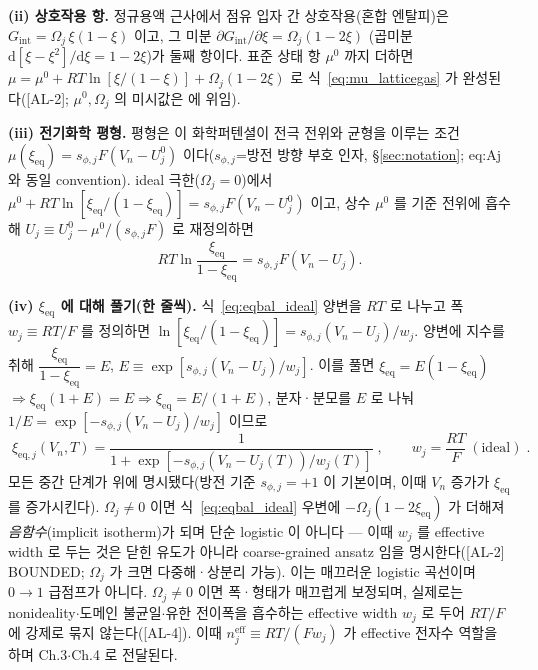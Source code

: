 \documentclass[11pt,a4paper]{article}
\newcommand{\dd}{\mathrm{d}}
\newcommand{\eff}{\mathrm{eff}}
\newcommand{\eq}{\mathrm{eq}}
\newcommand{\AL}[1]{\textsf{[AL-#1]}}
\begin{document}
\textbf{(ii) 상호작용 항.} 정규용액 근사에서 점유 입자 간 상호작용(혼합 엔탈피)은
$G_{\mathrm{int}}=\Omega_j\,\xi(1-\xi)$ 이고, 그 미분 $\partial G_{\mathrm{int}}/\partial\xi
=\Omega_j(1-2\xi)$ (곱미분 $\dd[\xi-\xi^2]/\dd\xi=1-2\xi$)가 둘째 항이다. 표준 상태 항 $\mu^0$ 까지 더하면
$\mu=\mu^0+RT\ln[\xi/(1-\xi)]+\Omega_j(1-2\xi)$ 로 식~\eqref{eq:mu_latticegas} 가 완성된다(\AL{2};
$\mu^0,\Omega_j$ 의 미시값은 \cite{mckinnon1983,bazant2013} 에 위임).

\textbf{(iii) 전기화학 평형.} 평형은 이 화학퍼텐셜이 전극 전위와 균형을 이루는 조건
$\mu(\xi_\eq)=s_{\phi,j}F(V_n-U_j^0)$ 이다($s_{\phi,j}$=방전 방향 부호 인자, \S\ref{sec:notation};
eq:Aj 와 동일 convention). ideal 극한($\Omega_j=0$)에서 $\mu^0+RT\ln[\xi_\eq/(1-\xi_\eq)]
=s_{\phi,j}F(V_n-U_j^0)$ 이고, 상수 $\mu^0$ 를 기준 전위에 흡수해 $U_j\equiv U_j^0-\mu^0/(s_{\phi,j}F)$ 로
재정의하면
\begin{equation}
RT\ln\frac{\xi_\eq}{1-\xi_\eq}=s_{\phi,j}F(V_n-U_j).
\label{eq:eqbal_ideal}
\end{equation}

\textbf{(iv) $\xi_\eq$ 에 대해 풀기(한 줄씩).} 식~\eqref{eq:eqbal_ideal} 양변을 $RT$ 로 나누고 폭
$w_j\equiv RT/F$ 를 정의하면 $\ln[\xi_\eq/(1-\xi_\eq)]=s_{\phi,j}(V_n-U_j)/w_j$. 양변에 지수를 취해
$\dfrac{\xi_\eq}{1-\xi_\eq}=E$, $E\equiv\exp[s_{\phi,j}(V_n-U_j)/w_j]$. 이를 풀면 $\xi_\eq=E(1-\xi_\eq)$
$\Rightarrow\xi_\eq(1+E)=E\Rightarrow\xi_\eq=E/(1+E)$, 분자·분모를 $E$ 로 나눠 $1/E=\exp[-s_{\phi,j}(V_n-U_j)/w_j]$
이므로
\begin{equation}
\boxed{\;\xi_{\eq,j}(V_n,T)=\frac{1}{1+\exp[-s_{\phi,j}(V_n-U_j(T))/w_j(T)]}\;,\qquad w_j=\frac{RT}{F}\ (\text{ideal})\;.}
\label{eq:logistic}
\end{equation}
모든 중간 단계가 위에 명시됐다(방전 기준 $s_{\phi,j}=+1$ 이 기본이며, 이때 $V_n$ 증가가 $\xi_\eq$ 를 증가시킨다).
$\Omega_j\ne0$ 이면 식~\eqref{eq:eqbal_ideal} 우변에 $-\Omega_j(1-2\xi_\eq)$ 가 더해져 \emph{음함수}(implicit
isotherm)가 되며 단순 logistic 이 아니다 — 이때 $w_j$ 를 effective width 로 두는 것은 닫힌 유도가 아니라
coarse-grained ansatz 임을 명시한다(\AL{2} BOUNDED; $\Omega_j$ 가 크면 다중해·상분리 가능). 이는 매끄러운 logistic 곡선이며 $0\!\to\!1$ 급점프가
아니다. $\Omega_j\ne0$ 이면 폭·형태가 매끄럽게 보정되며, 실제로는 nonideality$\cdot$도메인 불균일$\cdot$유한
전이폭을 흡수하는 effective width $w_j$ 로 두어 $RT/F$ 에 강제로 묶지 않는다(\AL{4}). 이때
$n_j^{\eff}\equiv RT/(Fw_j)$ 가 effective 전자수 역할을 하며 Ch.3$\cdot$Ch.4 로 전달된다.
\end{document}
